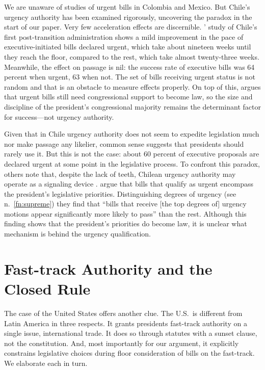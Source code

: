 \documentclass[letter,12pt]{article}
\begin{document}
We are unaware of studies of urgent bills in Colombia and Mexico. But Chile's urgency authority has been examined rigorously, uncovering the paradox in the start of our paper. Very few acceleration effects are discernible. \citeauthor{siavelis.2002}' \citeyearpar{siavelis.2002} study of Chile's first post-transition administration shows a mild improvement in the pace of executive-initiated bills declared urgent, which take about nineteen weeks until they reach the floor, compared to the rest, which take almost twenty-three weeks. Meanwhile, the effect on passage is nil: the success rate of executive bills was 64 percent when urgent, 63 when not. The set of bills receiving urgent status is not random and that is an obstacle to measure effects properly. On top of this, \citet[][, 51]{nolte.2003} argues that urgent bills still need congressional support to become law, so the size and discipline of the president's congressional majority remains the determinant factor for success---not urgency authority. 

Given that in Chile urgency authority does not seem to expedite legislation much nor make passage any likelier, common sense suggests that presidents should rarely use it. But this is not the case: about 60 percent of executive proposals are declared urgent at some point in the legislative process. To confront this paradox, others note that, despite the lack of teeth, Chilean urgency authority may operate as a signaling device \citep{berrios.gamboa.fiscChile.2006,aninat.exagCoop2006}. \citet{aleman.navia.UrgChi.2009} argue that bills that qualify as urgent encompass the president's legislative priorities. Distinguishing degrees of urgency (see n.~\ref{fn:supreme}) they find that ``bills that receive [the top degrees of] urgency motions appear significantly more likely to pass'' \citep[][, 404]{aleman.navia.UrgChi.2009} than the rest. Although this finding shows that the president's priorities do become law, it is unclear what mechanism is behind the urgency qualification.

\section*{Fast-track Authority and the Closed Rule}

The case of the United States offers another clue. The U.S.\ is different from Latin America in three respects. It grants presidents fast-track authority on a single issue, international trade. It does so through statutes with a sunset clause, not the constitution. And, most importantly for our argument, it explicitly constrains legislative choices during floor consideration of bills on the fast-track. We elaborate each in turn.
\end{document}
